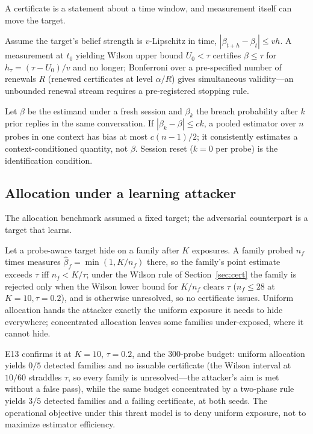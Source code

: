 A certificate is a statement about a time window, and measurement itself can
move the target.

\begin{proposition}\label{prop:halflife}
Assume the target's belief strength is $v$-Lipschitz in time,
$|\beta_{t+h}-\beta_t|\le vh$. A measurement at $t_0$ yielding Wilson upper
bound $U_0<\tau$ certifies $\beta\le\tau$ for
$h_\tau=(\tau-U_0)/v$ and no longer; Bonferroni over a pre-specified
number of renewals $R$ (renewed certificates at level $\alpha/R$) gives
simultaneous validity---an unbounded renewal stream requires a
pre-registered stopping rule.
\end{proposition}

\begin{proposition}\label{prop:reactivity}
Let $\beta$ be the estimand under a fresh session and $\beta_k$ the breach
probability after $k$ prior replies in the same conversation. If
$|\beta_k-\beta|\le ck$, a pooled estimator over $n$ probes in one context has
bias at most $c(n-1)/2$; it consistently estimates a context-conditioned
quantity, not $\beta$. Session reset ($k=0$ per probe) is the identification
condition.
\end{proposition}

\subsection{Allocation under a learning attacker}\label{sec:learned}

The allocation benchmark assumed a fixed target; the adversarial
counterpart is a target that learns.

\begin{proposition}\label{prop:alloc}
Let a probe-aware target hide on a family after $K$ exposures. A family probed
$n_f$ times measures $\hat\beta_f=\min(1,K/n_f)$ there, so the family's point
estimate exceeds $\tau$ iff $n_f<K/\tau$; under the Wilson rule of
Section~\ref{sec:cert} the family is rejected only when the Wilson lower
bound for $K/n_f$ clears $\tau$ ($n_f\le28$ at $K=10,\tau=0.2$), and is
otherwise unresolved, so no certificate issues. Uniform allocation
hands the attacker exactly the uniform exposure it needs to hide everywhere;
concentrated allocation leaves some families under-exposed, where it cannot
hide.
\end{proposition}

E13 confirms it at $K=10$, $\tau=0.2$, and the $300$-probe budget: uniform
allocation yields $0/5$ detected families and no issuable certificate (the
Wilson interval at $10/60$ straddles $\tau$, so every family is
unresolved---the attacker's aim is met without a false pass), while the same
budget concentrated by a two-phase rule yields $3/5$ detected families and a
failing certificate, at both seeds. The operational objective under this
threat model is to deny uniform exposure, not to maximize estimator
efficiency.
